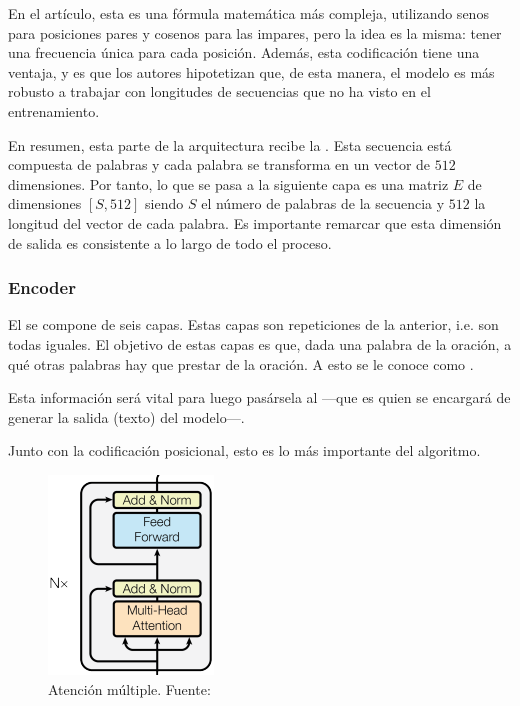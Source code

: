 En el artículo, esta es una fórmula matemática más compleja, utilizando senos para posiciones pares y cosenos para las impares, pero la idea es la misma: tener una frecuencia única para cada posición. Además, esta codificación tiene una ventaja, y es que los autores hipotetizan que, de esta manera, el modelo es más robusto a trabajar con longitudes de secuencias que no ha visto en el entrenamiento.

En resumen, esta parte de la arquitectura recibe la . Esta secuencia está compuesta de palabras y cada palabra se transforma en un vector de $512$ dimensiones. Por tanto, lo que se pasa a la siguiente capa es una matriz $E$ de dimensiones $[S, 512]$ siendo $S$ el número de palabras de la secuencia y $512$ la longitud del vector de  cada palabra.  Es importante remarcar que esta dimensión de salida es consistente a lo largo de todo el proceso.

\subsubsection{Encoder}
\label{encoder}
El  se compone de seis capas. Estas capas son repeticiones de la anterior, i.e. son todas iguales. El objetivo de estas capas es que, dada una palabra de la oración, a qué otras palabras hay que prestar  de la oración. A esto se le conoce como .

 Esta información será vital para luego pasársela al   ---que es quien se encargará de generar la salida (texto) del modelo---.

Junto con la codificación posicional, esto es lo más importante del algoritmo.
\begin{figure}[H]
    \centering
    \includegraphics[scale=1.1]{imgs/trans_arq_2.png}
    \caption{Atención múltiple. \scriptsize{Fuente: \parencite{transformers}}}
\end{figure}

